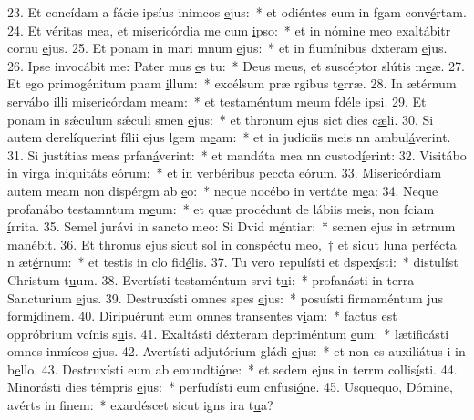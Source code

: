 23. Et concídam a fácie ipsíus inimcos \uline{e}jus:~* et odiéntes eum in fgam conv\uline{é}rtam.
24. Et véritas mea, et misericórdia me cum \uline{i}pso:~* et in nómine meo exaltábitr cornu \uline{e}jus.
25. Et ponam in mari mnum \uline{e}jus:~* et in flumínibus dxteram \uline{e}jus.
26. Ipse invocábit me: Pater mus \uline{e}s tu:~* Deus meus, et suscéptor slútis m\uline{e}æ.
27. Et ego primogénitum pnam \uline{i}llum:~* excélsum præ rgibus t\uline{e}rræ.
28. In ætérnum servábo illi misericórdam m\uline{e}am:~* et testaméntum meum fdéle \uline{i}psi.
29. Et ponam in sǽculum sǽculi smen \uline{e}jus:~* et thronum ejus sict dies c\uline{æ}li.
30. Si autem derelíquerint fílii ejus lgem m\uline{e}am:~* et in judíciis meis nn ambul\uline{á}verint.
31. Si justítias meas prfan\uline{á}verint:~* et mandáta mea nn custod\uline{í}erint:
32. Visitábo in virga iniquitáts e\uline{ó}rum:~* et in verbéribus peccta e\uline{ó}rum.
33. Misericórdiam autem meam non dispérgm ab \uline{e}o:~* neque nocébo in vertáte m\uline{e}a:
34. Neque profanábo testamntum m\uline{e}um:~* et quæ procédunt de lábiis meis, non fciam \uline{í}rrita.
35. Semel jurávi in sancto meo: Si Dvid m\uline{é}ntiar:~* semen ejus in ætrnum man\uline{é}bit.
36. Et thronus ejus sicut sol in conspéctu meo,~† et sicut luna perfécta n æt\uline{é}rnum:~* et testis in clo fid\uline{é}lis.
37. Tu vero repulísti et dspex\uline{í}sti:~* distulíst Christum t\uline{u}um.
38. Evertísti testaméntum srvi t\uline{u}i:~* profanásti in terra Sancturium \uline{e}jus.
39. Destruxísti omnes spes \uline{e}jus:~* posuísti firmaméntum jus form\uline{í}dinem.
40. Diripuérunt eum omnes transentes v\uline{i}am:~* factus est oppróbrium vcínis s\uline{u}is.
41. Exaltásti déxteram depriméntum \uline{e}um:~* lætificásti omnes inmícos \uline{e}jus.
42. Avertísti adjutórium gládi \uline{e}jus:~* et non es auxiliátus i in b\uline{e}llo.
43. Destruxísti eum ab emundti\uline{ó}ne:~* et sedem ejus in terrm collis\uline{í}sti.
44. Minorásti dies témpris \uline{e}jus:~* perfudísti eum cnfusi\uline{ó}ne.
45. Usquequo, Dómine, avérts in f\uline{i}nem:~* exardéscet sicut igns ira t\uline{u}a?
